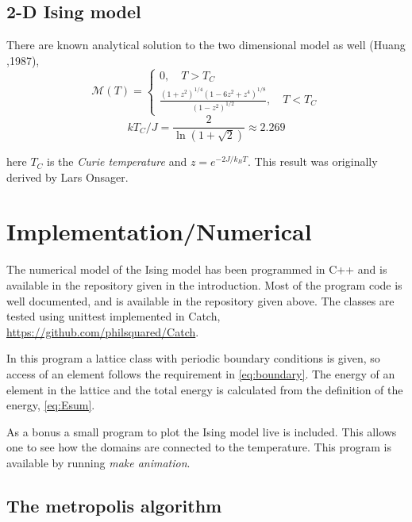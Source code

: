 \documentclass[11pt,a4paper,english,draft]{article}
\numberwithin{equation}{section}
\newcommand{\magM}{\mathcal{M}}
\begin{document}
\subsection{2-D Ising model}
There are known analytical solution to the two dimensional model as well (Huang ,1987),
\begin{equation}
\magM (T) = \begin{cases} 0, \quad T > T_C \\ \frac{(1+z^2)^{1/4} (1-6z^2 + z^4 )^{1/8} }{(1-z^2)^{1/2}}, \quad T < T_C \end{cases}
\end{equation}
\begin{equation}
k T_C/J = \frac{2}{\ln(1+ \sqrt{2}) } \approx 2.269
\end{equation}

here $T_C$ is the \emph{Curie temperature} and $z = e^{-2J/k_B T}$. This result was originally derived by Lars Onsager.

\section{Implementation/Numerical}

The numerical model of the Ising model has been programmed in C++ and is 
available in the repository given in the introduction.
Most of the program code is well documented, and is available in the 
repository given above. The classes are tested using unittest 
implemented in Catch, \url{https://github.com/philsquared/Catch}.

In this program a lattice class with periodic boundary conditions is given,
so access of an element follows the requirement in \eqref{eq:boundary}.
The energy of an element in the 
lattice and the total energy is calculated from the definition
of the energy, \eqref{eq:Esum}.

As a bonus a small program to plot the Ising model live is included. 
This allows one to see how the domains are connected to the temperature.
This program is available by running \emph{make animation}.


\subsection{The metropolis algorithm}
\end{document}
